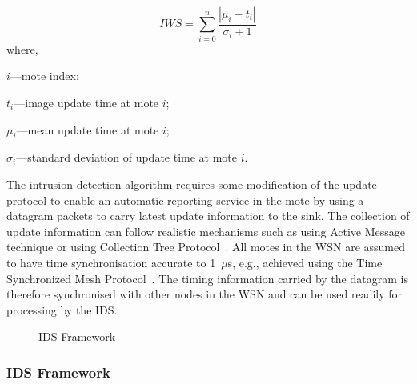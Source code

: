 \documentclass[conference,final]{IEEEtran}
\begin{document}
\begin{equation}
\label{eqn2} 
	\mathit{IWS} = \sum \limits_{i=0}^{n} \frac{\left| \mu_i - t_i \right|}{\sigma_i + 1}
\end{equation}
where, 
\begin{inparaenum}
\item $\mathit{i}$---mote index;%
\item $\mathit{t_i}$---image update time at mote $\mathit{i}$;  
\item $\mathit{\mu_i}$---mean update time at mote $\mathit{i}$;  
\item $\mathit{\sigma_i}$---standard deviation of update time at mote $\mathit{i}$. 
\end{inparaenum}

The intrusion detection algorithm requires some modification of the update protocol to enable an automatic reporting service in the mote by using a datagram packets to carry latest update information to the sink.
The collection of update information can follow realistic mechanisms such as using Active Message technique\cite{tep116} or using Collection Tree Protocol~\cite{tep123, ctptosn2014}.
All motes in the WSN are assumed to have time synchronisation accurate to 1~$\mu$s, e.g., achieved using the Time Synchronized Mesh Protocol~\cite{Pister08tsmp:time}.
The timing information carried by the datagram is therefore synchronised with other nodes in the WSN and can be used readily for processing by the IDS.

\begin{figure}[btp]
    \centering
    \caption{IDS Framework}
    \label{fig:ids_fw}
\end{figure}

\subsubsection*{IDS Framework}
\label{ssc:ids_fw}
\end{document}
